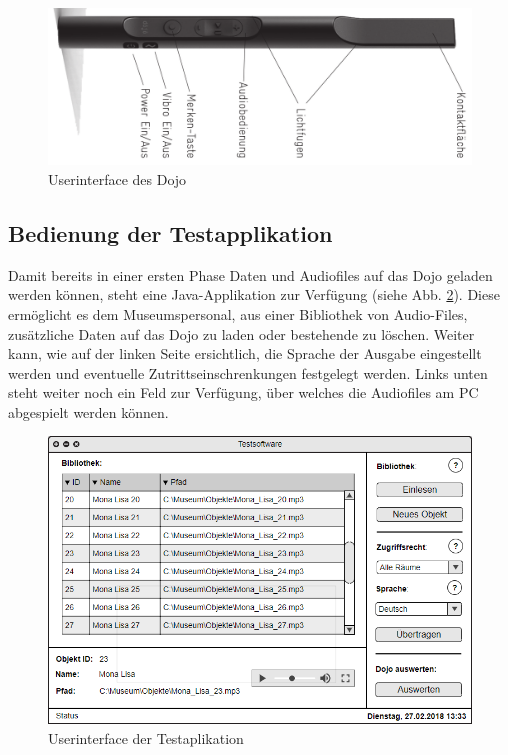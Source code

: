 \documentclass[10pt,a4paper,oneside]{99_fhnwreport}
\begin{document}
\begin{figure}[htb]
\includegraphics[width=\textwidth]{dojointerface.png}
\caption{Userinterface des Dojo \cite{DOJO}} %
\label{fig:dojointerface}
\end{figure}

\newpage

\subsection{Bedienung der Testapplikation}
Damit bereits in einer ersten Phase Daten und Audiofiles auf das Dojo geladen werden können, steht eine Java-Applikation zur Verfügung (siehe Abb. \ref{fig:testaplikation}). Diese ermöglicht es dem Museumspersonal, aus einer Bibliothek von Audio-Files, zusätzliche Daten auf das Dojo zu laden oder bestehende zu löschen. Weiter kann, wie auf der linken Seite ersichtlich, die Sprache der Ausgabe eingestellt werden und eventuelle Zutrittseinschrenkungen festgelegt werden. Links unten steht weiter noch ein Feld zur Verfügung, über welches die Audiofiles am PC abgespielt werden können.

\begin{figure}[htb]
\includegraphics[width=\textwidth]{Testsoftware.png}
\caption{Userinterface der Testaplikation} %
\label{fig:testaplikation}
\end{figure}
\end{document}
